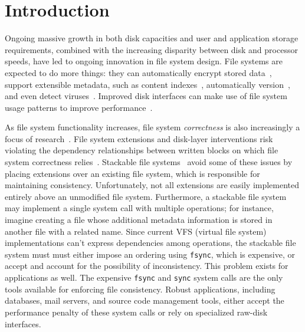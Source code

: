 
\section {Introduction}
\label{sec:intro}


Ongoing massive growth in both disk capacities and user and application
 storage requirements, combined with the increasing
 disparity between disk and processor speeds, have led to ongoing
 innovation in file system design.
%
File systems are expected to do more things: they can automatically encrypt
 stored data~\cite{wright03ncryptfs}, support extensible metadata, such as
 content indexes~\cite{jouvelot91semantic}, automatically
 version~\cite{soules03metadata,fast04versionfs,quinlan02venti,cornell04wayback},
 and even detect viruses~\cite{miretskiy04avfs}.
%
Improved disk interfaces can make use of file system usage patterns to
 improve
 performance~\cite{sivathanu03semantically-smart,sivathanu05database-aware}.



As file system functionality increases, file system \emph{correctness} is
 also increasingly a focus of
 research~\cite{sivathanuetal05-logic,denehyetal05-journal-guided}.
%
File system extensions and disk-layer interventions risk violating
 the dependency relationships between written blocks on which file system
 correctness relies~\cite{ganger00soft,...}.
%
Stackable file
 systems~\cite{zadok00fist,zadok99extending,heidemann94filesystem,rosenthal90evolving}
 avoid some of these issues by placing extensions over an existing
 file system, which is responsible for maintaining consistency.
%
Unfortunately, not all extensions are easily implemented entirely above an
 unmodified file system.
%
Furthermore, a stackable file system may implement a single system call
 with multiple operations; for instance, imagine creating a file whose
 additional metadata information is stored in another file with a related
 name.
%
Since current VFS (virtual file system) implementations can't
 express dependencies among operations, the stackable
 file system must must either impose an ordering using \texttt{fsync},
 which is expensive, or accept and account for the possibility of
 inconsistency.
%
This problem exists for applications as well.
%
The expensive \texttt{fsync} and \texttt{sync} system calls are the only
 tools available for enforcing file consistency.
%
Robust applications, including databases, mail servers, and source code
 management tools, either accept the performance penalty of these system
 calls or rely on specialized raw-disk interfaces.



